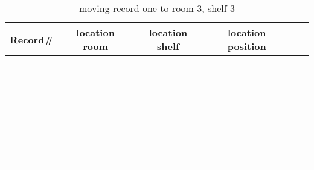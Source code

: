 \documentclass[]{article}
\begin{document}
		\begin{center}
			\begin{longtable}{|c|c|c|c|c|c|}
			\caption{moving record one to room 3, shelf 3} \\ 
			\hline
			\hline
			Record\# & location room & location shelf & location position \\ 
			\hline
				\phantom{1} & & &  \\
			\hline
				\phantom{1} & & &  \\
			\hline
				\phantom{1} & & &  \\
			\hline
				\phantom{1} & & &  \\
			\hline
				\phantom{1} & & &  \\
			\hline
				\phantom{1} & & &  \\
			\hline
				\phantom{1} & & &  \\
			\hline
				\phantom{1} & & &  \\
			\hline
			\phantom{1} & & &  \\
			\hline
				\phantom{1} & & &  \\
			\hline
				\phantom{1} & & &  \\
			\hline
				\phantom{1} & & &  \\
			\hline
				\phantom{1} & & &  \\
			\hline
				\phantom{1} & & &  \\
			\hline
				\phantom{1} & & &  \\
			\hline
				\phantom{1} & & &  \\
			\hline
				\phantom{1} & & &  \\
			\hline
				\phantom{1} & & &  \\
			\hline
			\phantom{1} & & &  \\
			\hline
				\phantom{1} & & &  \\
			\hline
				\phantom{1} & & &  \\
			\hline
				\phantom{1} & & &  \\
			\hline
				\phantom{1} & & &  \\
			\hline
				\phantom{1} & & &  \\
			\hline
				\phantom{1} & & &  \\
			\hline
				\phantom{1} & & &  \\
			\hline
				\phantom{1} & & &  \\
			\hline
				\phantom{1} & & &  \\
			\hline
			\phantom{1} & & &  \\
			\hline
				\phantom{1} & & &  \\
			\hline
			\hline
		\end{longtable}
		\end{center}
\end{document}
